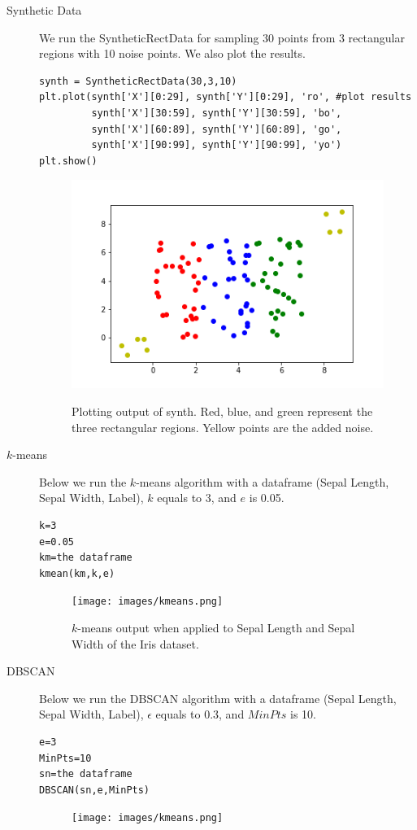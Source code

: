 \documentclass[psamsfonts,onesided,10pt]{amsart}
\begin{document}
\begin{description}
\item[Synthetic Data] We run the SyntheticRectData for sampling 30 points from 3 
rectangular regions with 10 noise points. We also plot the results.
\begin{verbatim}
synth = SyntheticRectData(30,3,10)
plt.plot(synth['X'][0:29], synth['Y'][0:29], 'ro', #plot results
         synth['X'][30:59], synth['Y'][30:59], 'bo', 
         synth['X'][60:89], synth['Y'][60:89], 'go',
         synth['X'][90:99], synth['Y'][90:99], 'yo')
plt.show()   
\end{verbatim}
\begin{figure}[H]
    \centering
    {\includegraphics[width=.4\textwidth]{images/synth.png}} \\
    \caption{Plotting output of synth. Red, blue, and green represent the three rectangular regions. 
Yellow points are the added noise.}
\end{figure}
\item[$k$-means] Below we run the $k$-means algorithm with a dataframe (Sepal Length, Sepal Width, Label), $k$ equals to 3, and $e$ is 0.05. 
\begin{verbatim}
k=3
e=0.05
km=the dataframe
kmean(km,k,e)
\end{verbatim}
\begin{figure}[H]
    \centering
    {\texttt{[image: images/kmeans.png]}} \\
    \caption{$k$-means output when applied to Sepal Length and Sepal Width of the Iris dataset.}
\end{figure}

\item[DBSCAN] Below we run the DBSCAN algorithm with a dataframe (Sepal Length, Sepal Width, Label), $\epsilon$ equals to 0.3, and $MinPts$ is 10. 
\begin{verbatim}
e=3
MinPts=10
sn=the dataframe
DBSCAN(sn,e,MinPts)
\end{verbatim}
\begin{figure}[H]
    \centering
    {\texttt{[image: images/kmeans.png]}} \\
\end{figure}


\end{description}
\end{document}
